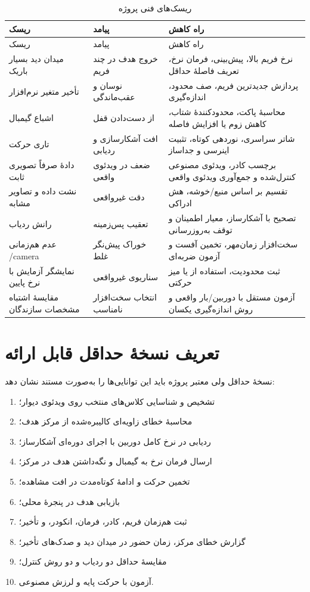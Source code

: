 \documentclass[12pt,a4paper]{article}
\newcommand{\EN}[1]{\lr{#1}}
\begin{document}
\begin{longtable}{p{4cm}p{5.2cm}p{5cm}}
\caption{ریسک‌های فنی پروژه}\label{tab:risks}\\
\toprule
ریسک & پیامد & راه کاهش \\
\midrule
\endfirsthead
\toprule
ریسک & پیامد & راه کاهش \\
\midrule
\endhead
میدان دید بسیار باریک & خروج هدف در چند فریم & نرخ فریم بالا، پیش‌بینی، فرمان نرخ، تعریف فاصلهٔ حداقل \\
تأخیر متغیر نرم‌افزار & نوسان و عقب‌ماندگی & پردازش جدیدترین فریم، صف محدود، اندازه‌گیری \EN{p99} \\
اشباع گیمبال & از دست‌دادن قفل & محاسبهٔ پاکت، محدودکنندهٔ شتاب، کاهش زوم یا افزایش فاصله \\
تاری حرکت & افت آشکارسازی و ردیابی & شاتر سراسری، نوردهی کوتاه، تثبیت اینرسی و جداساز \\
دادهٔ صرفاً تصویری ثابت & ضعف در ویدئوی واقعی & برچسب کادر، ویدئوی مصنوعی کنترل‌شده و جمع‌آوری ویدئوی واقعی \\
نشت داده و تصاویر مشابه & دقت غیرواقعی & تقسیم بر اساس منبع/خوشه، هش ادراکی \\
رانش ردیاب & تعقیب پس‌زمینه & تصحیح با آشکارساز، معیار اطمینان و توقف به‌روزرسانی \\
عدم هم‌زمانی \EN{IMU}/camera & خوراک پیش‌نگر غلط & سخت‌افزار زمان‌مهر، تخمین آفست و آزمون ضربه‌ای \\
نمایشگر آزمایش با نرخ پایین & سناریوی غیرواقعی & ثبت محدودیت، استفاده از \EN{120 Hz} یا میز حرکتی \\
مقایسهٔ اشتباه مشخصات سازندگان & انتخاب سخت‌افزار نامناسب & آزمون مستقل با دوربین/بار واقعی و روش اندازه‌گیری یکسان \\
\bottomrule
\end{longtable}

\section{تعریف نسخهٔ حداقل قابل ارائه}

نسخهٔ حداقل ولی معتبر پروژه باید این توانایی‌ها را به‌صورت مستند نشان دهد:

\begin{enumerate}
    \item تشخیص و شناسایی کلاس‌های منتخب روی ویدئوی دیوار؛
    \item محاسبهٔ خطای زاویه‌ای کالیبره‌شده از مرکز هدف؛
    \item ردیابی در نرخ کامل دوربین با اجرای دوره‌ای آشکارساز؛
    \item ارسال فرمان نرخ به گیمبال و نگه‌داشتن هدف در مرکز؛
    \item تخمین حرکت و ادامهٔ کوتاه‌مدت در افت مشاهده؛
    \item بازیابی هدف در پنجرهٔ محلی؛
    \item ثبت هم‌زمان فریم، کادر، فرمان، انکودر، \EN{IMU} و تأخیر؛
    \item گزارش خطای مرکز، زمان حضور در میدان دید و صدک‌های تأخیر؛
    \item مقایسهٔ حداقل دو ردیاب و دو روش کنترل؛
    \item آزمون با حرکت پایه و لرزش مصنوعی.
\end{enumerate}
\end{document}
